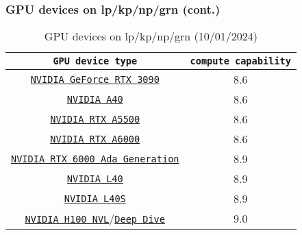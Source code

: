 \begin{frame}
	\frametitle{GPU devices on lp/kp/np/grn (cont.)}
\begin{table}[H]
   \begin{center}
     \begin{tabular}{c|c}
             \texttt{GPU device type} & \texttt{compute capability} \\
      \hline
        \href{https://www.nvidia.com/en-us/geforce/graphics-cards/30-series/rtx-3090-3090ti/}{\small{\texttt{NVIDIA GeForce RTX 3090}}} & \small{8.6} \\ 
        \href{https://images.nvidia.com/content/Solutions/data-center/a40/nvidia-a40-datasheet.pdf}{\small{\texttt{NVIDIA A40}}}     & \small{8.6} \\
	     \href{https://www.nvidia.com/content/dam/en-zz/Solutions/gtcs22/design-visualization/quadro-product-literature/proviz-nvidia-rtx-a5500-datasheet-2130578-r3-us-web.pdf}{\small{\texttt{NVIDIA RTX A5500}}} & \small{8.6} \\
	     \href{https://www.nvidia.com/en-us/design-visualization/rtx-a6000/}{\small{\texttt{NVIDIA RTX A6000}}} & \small{8.6} \\
	     \href{https://www.nvidia.com/content/dam/en-zz/Solutions/design-visualization/rtx-6000/proviz-print-rtx6000-datasheet-web-2504660.pdf}{\small{\texttt{NVIDIA RTX 6000 Ada Generation}}}&  \small{8.9} \\
	     \href{https://www.nvidia.com/en-us/data-center/l40/}{\small{\texttt{NVIDIA L40}}} & \small{8.9} \\
	     \href{https://resources.nvidia.com/en-us-l40s/l40s-datasheet-28413}{\small{\texttt{NVIDIA L40S}}} & \small{8.9} \\
	     \href{https://www.nvidia.com/en-us/data-center/h100/}{\small{\texttt{NVIDIA H100 NVL}}}/\href{https://www.nvidia.com/content/dam/en-zz/Solutions/Data-Center/h100/PB-11773-001\_v01.pdf}{\small{\texttt{Deep Dive}}} &  \small{9.0} \\
        \hline
     \end{tabular}
   \end{center}
   \caption{GPU devices on lp/kp/np/grn (10/01/2024)}
\end{table}
\end{frame}

